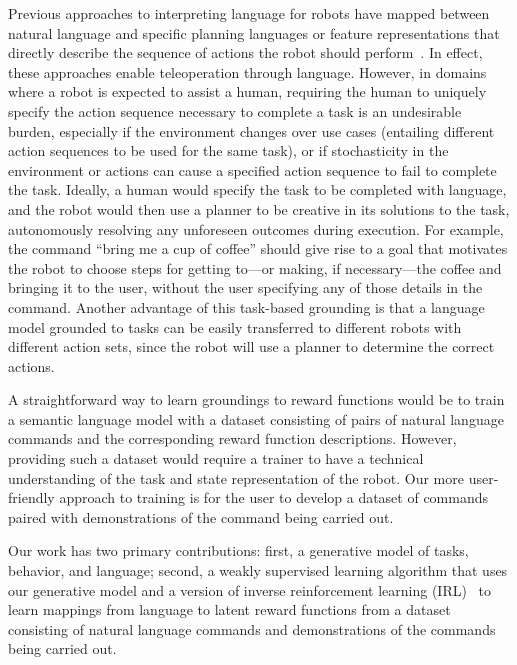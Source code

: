 \documentclass[conference]{IEEEtran}
\begin{document}
Previous approaches to interpreting language for
robots have mapped between natural language and specific planning
languages or feature representations that directly describe the
sequence of actions the robot should perform~\citep{kollar10,
  tellex11, matuszek12, matuszek12a, chen11}. In effect,
these approaches enable teleoperation through language.  
However, in domains where a robot is expected to assist
a human, requiring the human to uniquely specify the action
sequence necessary to complete a task is an undesirable burden, especially
if the environment changes over use cases (entailing different
action sequences to be used for the same task), or if stochasticity in the
environment or actions can cause a specified action sequence to fail to complete
the task. Ideally, a human would specify the task to be completed with language, and the robot would then use a planner to be creative
in its solutions to the task, autonomously resolving any unforeseen
outcomes during execution. For example, the command ``bring me a cup
of coffee'' should give rise to a goal that motivates the robot to
choose steps for getting to---or making, if necessary---the coffee and 
bringing it to the user, without
the user specifying any of those details in the command. Another advantage
of this task-based grounding is that a language model grounded to tasks
can be easily transferred to different robots with different action sets,
since the robot will use a planner to determine the correct actions.


A straightforward way to learn groundings to reward functions would be to train a semantic
language model with a dataset consisting of pairs of natural language commands
and the corresponding reward function descriptions. However,
providing such a dataset would require a trainer to have a technical understanding
of the task and state representation of the robot. Our more user-friendly approach
to training is for the user to develop a dataset of commands paired with
demonstrations of the command being carried out. 

Our work has two primary contributions: first, a generative model of tasks, behavior, 
and language; second, a weakly supervised learning algorithm that uses
our generative model and a version of inverse reinforcement learning (IRL)~\cite{ng00}
to learn mappings from language to latent reward functions 
from a dataset consisting of natural language commands and demonstrations
of the commands being carried out.
\end{document}

